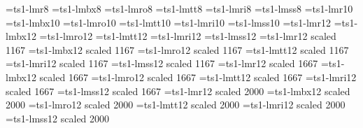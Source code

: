 \font\eightcrm=ts1-lmr8
\font\eightcbf=ts1-lmbx8
\font\eightcsl=ts1-lmro8
\font\eightctt=ts1-lmtt8
\font\eightcit=ts1-lmri8
\font\eightcss=ts1-lmss8
\font\tencrm=ts1-lmr10
\font\tencbf=ts1-lmbx10
\font\tencsl=ts1-lmro10
\font\tenctt=ts1-lmtt10
\font\tencit=ts1-lmri10
\font\tencss=ts1-lmss10
\font\twelvecrm=ts1-lmr12
\font\twelvecbf=ts1-lmbx12
\font\twelvecsl=ts1-lmro12
\font\twelvectt=ts1-lmtt12
\font\twelvecit=ts1-lmri12
\font\twelvecss=ts1-lmss12
\font\fourteencrm=ts1-lmr12 scaled 1167
\font\fourteencbf=ts1-lmbx12 scaled 1167
\font\fourteencsl=ts1-lmro12 scaled 1167
\font\fourteenctt=ts1-lmtt12 scaled 1167
\font\fourteencit=ts1-lmri12 scaled 1167
\font\fourteencss=ts1-lmss12 scaled 1167
\font\twentycrm=ts1-lmr12 scaled 1667
\font\twentycbf=ts1-lmbx12 scaled 1667
\font\twentycsl=ts1-lmro12 scaled 1667
\font\twentyctt=ts1-lmtt12 scaled 1667
\font\twentycit=ts1-lmri12 scaled 1667
\font\twentycss=ts1-lmss12 scaled 1667
\font\twentyfourcrm=ts1-lmr12 scaled 2000
\font\twentyfourcbf=ts1-lmbx12 scaled 2000
\font\twentyfourcsl=ts1-lmro12 scaled 2000
\font\twentyfourctt=ts1-lmtt12 scaled 2000
\font\twentyfourcit=ts1-lmri12 scaled 2000
\font\twentyfourcss=ts1-lmss12 scaled 2000
\def\t#1{{\edef\next{\the\font}\tcfont\accent"1B\next#1}}
\def\tcchar#1{{\edef\next{\the\font}\tcfont\char#1\next}}
\def\arrowl{{\tcchar{"18}}}
\def\arrowr{{\tcchar{"19}}}
\def\blank{{\tcchar{"20}}}
\def\dollar{{\tcchar{"24}}}
\def\caster{{\tcchar{"2A}}}
\def\sequals{{\tcchar{"2D}}}
\def\anglel{{\tcchar{"3C}}}
\def\angler{{\tcchar{"3E}}}
\def\mho{{\tcchar{"4D}}}
\def\bigcircle{{\tcchar{"4F}}}
\def\Ohm{{\tcchar{"57}}}
\def\bbracketl{{\tcchar{"5B}}}
\def\bbracketr{{\tcchar{"5D}}}
\def\arrowu{{\tcchar{"5E}}}
\def\arrowd{{\tcchar{"5F}}}
\def\textstar{{\tcchar{"62}}}
\def\born{{\tcchar{"63}}}
\def\died{{\tcchar{"64}}}
\def\leaf{{\tcchar{"6C}}}
\def\married{{\tcchar{"6D}}}
\def\music{{\tcchar{"6E}}}
\def\dag{{\tcchar{"84}}}%
\def\ddag{{\tcchar{"85}}}%
\def\doublevert{{\tcchar{"86}}}
\def\perthousand{{\tcchar{"87}}}
\def\bull{{\tcchar{"88}}}
\def\centigrade{{\tcchar{"89}}}
\def\olddollar{{\tcchar{"8A}}}
\def\oldcent{{\tcchar{"8B}}}
\def\florin{{\tcchar{"8C}}}
\def\Colon{{\tcchar{"8D}}}
\def\won{{\tcchar{"8E}}}
\def\naira{{\tcchar{"8F}}}
\def\guarani{{\tcchar{"90}}}
